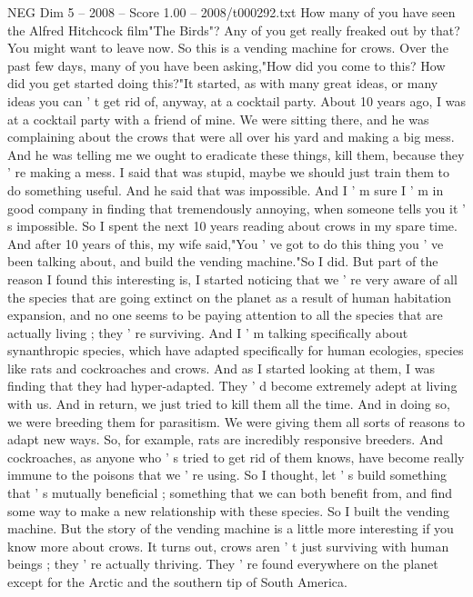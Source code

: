 \begin{textsample}{NEG Dim 5 – 2008 – Score 1.00 – 2008/t000292.txt}  \label{ex:f5_neg_069}
How many of you have seen the Alfred Hitchcock film"The Birds"?
Any of you get really freaked out by that?
You might want to leave now.
So this is a vending machine for crows.
Over the past few days, many of you have been asking,"How did you come to this?
How did you get started doing this?"It started, as with many great ideas, or many ideas you can ' t get rid of, anyway, at a cocktail party.
About 10 years ago, I was at a cocktail party with a friend of mine.
We were sitting there, and he was complaining about the crows that were all over his yard and making a big mess.
And he was telling me we ought to eradicate these things, kill them, because they ' re making a mess.
I said that was stupid, maybe we should just train them to do something useful.
And he said that was impossible.
And I ' m sure I ' m in good company in finding that tremendously annoying, when someone tells you it ' s impossible.
So I spent the next 10 years reading about crows in my spare time.
And after 10 years of this, my wife said,"You ' ve got to do this thing you ' ve been talking about, and build the vending machine."So I did.
But part of the reason I found this interesting is, I started noticing that we ' re very aware of all the species that are going extinct on the planet as a result of human habitation expansion, and no one seems to be paying attention to all the species that are actually living ; they ' re surviving.
And I ' m talking specifically about synanthropic species, which have adapted specifically for human ecologies, species like rats and cockroaches and crows.
And as I started looking at them, I was finding that they had hyper-adapted.
They ' d become extremely adept at living with us.
And in return, we just tried to kill them all the time.
And in doing so, we were breeding them for parasitism.
We were giving them all sorts of reasons to adapt new ways.
So, for example, rats are incredibly responsive breeders.
And cockroaches, as anyone who ' s tried to get rid of them knows, have become really immune to the poisons that we ' re using.
So I thought, let ' s build something that ' s mutually beneficial ; something that we can both benefit from, and find some way to make a new relationship with these species.
So I built the vending machine.
But the story of the vending machine is a little more interesting if you know more about crows.
It turns out, crows aren ' t just surviving with human beings ; they ' re actually thriving.
They ' re found everywhere on the planet except for the Arctic and the southern tip of South America.

\end{textsample}

